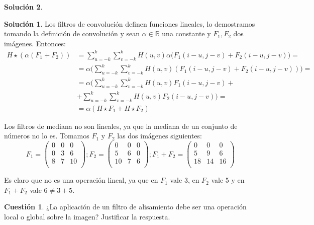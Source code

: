 \documentclass[a4paper, 11pt]{article}
\theoremstyle{definition}
\newtheorem{cuestion}{Cuestión}
\newtheorem*{solucion}{Solución}
\begin{document}
  \begin{solucion}
    \begin{solucion}
    Los filtros de convolución definen funciones lineales, lo demostramos tomando la definición de convolución y sean $\alpha\in\mathbb{R}$ una constante y $F_1,F_2$ dos imágenes. Entonces:
    \begin{align*}
        H\star(\alpha(F_1+F_2)) &= \sum_{u=-k}^k\sum_{v=-k}^k H(u,v)\alpha\biggl(F_1(i-u,j-v)+F_2(i-u,j-v)\biggr) = \\
        &= \alpha\biggl(\sum_{u=-k}^k\sum_{v=-k}^k H(u,v)(F_1(i-u,j-v)+F_2(i-u,j-v))\biggr) = \\
        &= \alpha\biggl(\sum_{u=-k}^k\sum_{v=-k}^k H(u,v)F_1(i-u,j-v) + \\
        &+ \sum_{u=-k}^k\sum_{v=-k}^k H(u,v)F_2(i-u,j-v)\biggr) = \\
        &= \alpha(H\star F_1 + H\star F_2)
    \end{align*}

    Los filtros de mediana no son lineales, ya que la mediana de un conjunto de números no lo es. Tomamos $F_1$ y $F_2$ las dos imágenes siguientes:
    \[
    F_1 = \left(
    \begin{array}{ccc}
        0 & 0 & 0 \\
        0 & 3 & 6 \\
        8 & 7 & 10 \\
    \end{array}
    \right);
    F_2 = \left(
    \begin{array}{ccc}
        0 & 0 & 0 \\
        5 & 6 & 0 \\
        10 & 7 & 6 \\
    \end{array}
    \right);
    F_1+F_2 = \left(
    \begin{array}{ccc}
        0 & 0 & 0 \\
        5 & 9 & 6 \\
        18 & 14 & 16 \\
    \end{array}
    \right)
    \]

    Es claro que no es una operación lineal, ya que en $F_1$ vale 3, en $F_2$ vale 5 y en $F_1+F_2$ vale $6\neq3+5$.
\end{solucion}
  \end{solucion}

  \begin{cuestion}
      ¿La aplicación de un filtro de alisamiento debe ser una operación
      local o global sobre la imagen? Justificar la respuesta.
  \end{cuestion}
\end{document}
